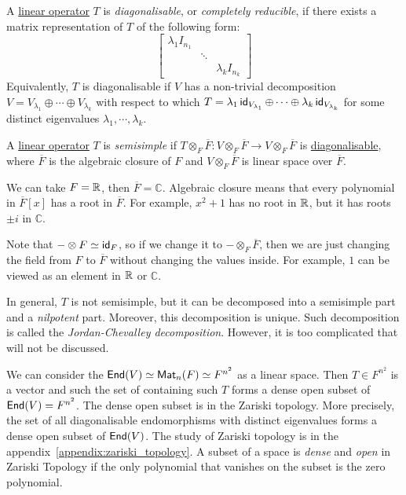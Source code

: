 \begin{definition}[Diagonalisable]\label{def:diagonalisable}
  A \hyperref[def:linear_operator]{linear operator} $T$ is \emph{diagonalisable}, or \emph{completely reducible}, if there exists a matrix representation of $T$ of the following form:
  \[
    \begin{bmatrix}
      \lambda_1 I_{n_1} &        &                   \\
                        & \ddots &                   \\
                        &        & \lambda_k I_{n_k}
    \end{bmatrix}
  \]
  Equivalently, $T$ is diagonalisable if $V$ has a non-trivial decomposition $V = V_{\lambda_1} \oplus \cdots \oplus V_{\lambda_k}$ with respect to which $T = \lambda_1 \operatorname{\text{\normalfont\sffamily id}}_{V_{\lambda_1}} \oplus \cdots \oplus \lambda_k \operatorname{\text{\normalfont\sffamily id}}_{V_{\lambda_k}}$ for some distinct eigenvalues $\lambda_1, \cdots, \lambda_k$.
\end{definition}

\begin{definition}[Semisimple]\label{def:semisimple}
  A \hyperref[def:linear_operator]{linear operator} $T$ is \emph{semisimple} if $T \otimes_{F} \overline{F} : V \otimes_{F} \overline{F} \to V \otimes_{F} \overline{F}$ is \hyperref[def:diagonalisable]{diagonalisable}, where $\overline{F}$ is the algebraic closure of $F$ and $V \otimes_{F} \overline{F}$ is linear space over $\overline{F}$.
\end{definition}
\begin{remark}
  We can take $F = \operatorname{\mathbb{R}}$, then $\overline{F} = \mathbb{C}$. Algebraic closure means that every polynomial in $\overline{F}[x]$ has a root in $\overline{F}$. For example, $x^2 + 1$ has no root in $\operatorname{\mathbb{R}}$, but it has roots $\pm i$ in $\mathbb{C}$.

  Note that $- \otimes F \simeq \operatorname{\text{\normalfont\sffamily id}}_{F}$, so if we change it to $- \otimes_{F} \overline{F}$, then we are just changing the field from $F$ to $\overline{F}$ without changing the values inside. For example, $1$ can be viewed as an element in $\operatorname{\mathbb{R}}$ or $\mathbb{C}$.
\end{remark}

In general, $T$ is not semisimple, but it can be decomposed into a semisimple part and a \emph{nilpotent} part. Moreover, this decomposition is unique. Such decomposition is called the \emph{Jordan-Chevalley decomposition}. However, it is too complicated that will not be discussed.

We can consider the $\operatorname{\text{\normalfont\sffamily End}}(V) \simeq \operatorname{\text{\normalfont\sffamily Mat}}_n(F) \simeq F^{n^2}$ as a linear space. Then $T \in F^{n^2}$ is a vector and such the set of containing such $T$ forms a dense open subset of $\operatorname{\text{\normalfont\sffamily End}}(V) = F^{n^2}$. The dense open subset is in the Zariski topology. More precisely, the set of all diagonalisable endomorphisms with distinct eigenvalues forms a dense open subset of $\operatorname{\text{\normalfont\sffamily End}}(V)$. The study of Zariski topology is in the appendix~\ref{appendix:zariski_topology}. A subset of a space is \emph{dense} and \emph{open} in Zariski Topology if the only polynomial that vanishes on the subset is the zero polynomial.

